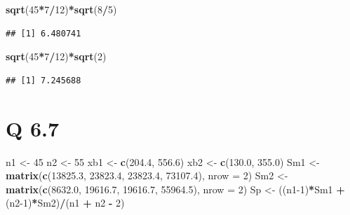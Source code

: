\documentclass[
]{article}
\newenvironment{Shaded}{\begin{snugshade}}{\end{snugshade}}
\newcommand{\AttributeTok}[1]{\textcolor[rgb]{0.13,0.29,0.53}{#1}}
\newcommand{\DecValTok}[1]{\textcolor[rgb]{0.00,0.00,0.81}{#1}}
\newcommand{\FloatTok}[1]{\textcolor[rgb]{0.00,0.00,0.81}{#1}}
\newcommand{\FunctionTok}[1]{\textcolor[rgb]{0.13,0.29,0.53}{\textbf{#1}}}
\newcommand{\NormalTok}[1]{#1}
\newcommand{\OtherTok}[1]{\textcolor[rgb]{0.56,0.35,0.01}{#1}}
\newcommand{\SpecialCharTok}[1]{\textcolor[rgb]{0.81,0.36,0.00}{\textbf{#1}}}
\begin{document}
\begin{Shaded}
\begin{Highlighting}[]
\FunctionTok{sqrt}\NormalTok{(}\DecValTok{45}\SpecialCharTok{*}\DecValTok{7}\SpecialCharTok{/}\DecValTok{12}\NormalTok{)}\SpecialCharTok{*}\FunctionTok{sqrt}\NormalTok{(}\DecValTok{8}\SpecialCharTok{/}\DecValTok{5}\NormalTok{)}
\end{Highlighting}
\end{Shaded}

\begin{verbatim}
## [1] 6.480741
\end{verbatim}

\begin{Shaded}
\begin{Highlighting}[]
\FunctionTok{sqrt}\NormalTok{(}\DecValTok{45}\SpecialCharTok{*}\DecValTok{7}\SpecialCharTok{/}\DecValTok{12}\NormalTok{)}\SpecialCharTok{*}\FunctionTok{sqrt}\NormalTok{(}\DecValTok{2}\NormalTok{)}
\end{Highlighting}
\end{Shaded}

\begin{verbatim}
## [1] 7.245688
\end{verbatim}

\section{Q 6.7}\label{q-6.7}

\begin{Shaded}
\begin{Highlighting}[]
\NormalTok{n1 }\OtherTok{\textless{}{-}} \DecValTok{45}
\NormalTok{n2 }\OtherTok{\textless{}{-}} \DecValTok{55}
\NormalTok{xb1 }\OtherTok{\textless{}{-}} \FunctionTok{c}\NormalTok{(}\FloatTok{204.4}\NormalTok{, }\FloatTok{556.6}\NormalTok{)}
\NormalTok{xb2 }\OtherTok{\textless{}{-}} \FunctionTok{c}\NormalTok{(}\FloatTok{130.0}\NormalTok{, }\FloatTok{355.0}\NormalTok{)}
\NormalTok{Sm1 }\OtherTok{\textless{}{-}} \FunctionTok{matrix}\NormalTok{(}\FunctionTok{c}\NormalTok{(}\FloatTok{13825.3}\NormalTok{, }\FloatTok{23823.4}\NormalTok{, }\FloatTok{23823.4}\NormalTok{, }\FloatTok{73107.4}\NormalTok{), }\AttributeTok{nrow =} \DecValTok{2}\NormalTok{)}
\NormalTok{Sm2 }\OtherTok{\textless{}{-}} \FunctionTok{matrix}\NormalTok{(}\FunctionTok{c}\NormalTok{(}\FloatTok{8632.0}\NormalTok{, }\FloatTok{19616.7}\NormalTok{, }\FloatTok{19616.7}\NormalTok{, }\FloatTok{55964.5}\NormalTok{), }\AttributeTok{nrow =} \DecValTok{2}\NormalTok{)}
\NormalTok{Sp }\OtherTok{\textless{}{-}}\NormalTok{ ((n1}\DecValTok{{-}1}\NormalTok{)}\SpecialCharTok{*}\NormalTok{Sm1 }\SpecialCharTok{+}\NormalTok{ (n2}\DecValTok{{-}1}\NormalTok{)}\SpecialCharTok{*}\NormalTok{Sm2)}\SpecialCharTok{/}\NormalTok{(n1 }\SpecialCharTok{+}\NormalTok{ n2 }\SpecialCharTok{{-}} \DecValTok{2}\NormalTok{)}
\end{Highlighting}
\end{Shaded}
\end{document}
